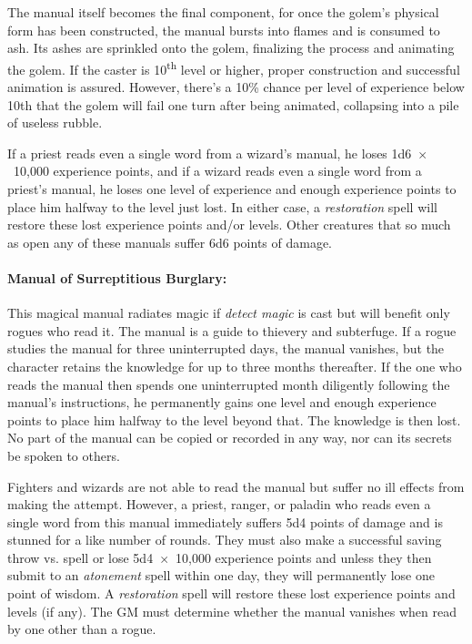 \begin{multicols}{2}
The manual itself becomes the final component, for once the golem's physical form has been constructed, the manual bursts into flames and is consumed to ash.  Its ashes are sprinkled onto the golem, finalizing the process and animating the golem.  If the caster is 10\textsuperscript{th} level or higher, proper construction and successful animation is assured.  However, there's a 10\% chance per level of experience below 10th that the golem will fail one turn after being animated, collapsing into a pile of useless rubble.

If a priest reads even a single word from a wizard's manual, he loses 1d6~$\times$~10,000 experience points, and if a wizard reads even a single word from a priest's manual, he loses one level of experience and enough experience points to place him halfway to the level just lost.  In either case, a \textit{restoration} spell will restore these lost experience points and/or levels.  Other creatures that so much as open any of these manuals suffer 6d6 points of damage.

\paragraph{Manual of Surreptitious Burglary:} This magical manual radiates magic if \textit{detect magic} is cast but will benefit only rogues who read it.  The manual is a guide to thievery and subterfuge.  If a rogue studies the manual for three uninterrupted days, the manual vanishes, but the character retains the knowledge for up to three months thereafter.  If the one who reads the manual then spends one uninterrupted month diligently following the manual's instructions, he permanently gains one level and enough experience points to place him halfway to the level beyond that.    The knowledge is then lost.  No part of the manual can be copied or recorded in any way, nor can its secrets be spoken to others.

Fighters and wizards are not able to read the manual but suffer no ill effects from making the attempt.  However, a priest, ranger, or paladin who reads even a single word from this manual immediately suffers 5d4 points of damage and is stunned for a like number of rounds.  They must also make a successful saving throw vs. spell or lose 5d4~$\times$~10,000 experience points and unless they then submit to an \textit{atonement} spell within one day, they will permanently lose one point of wisdom.  A \textit{restoration} spell will restore these lost experience points and levels (if any).  The GM must determine whether the manual vanishes when read by one other than a rogue.


\end{multicols}
